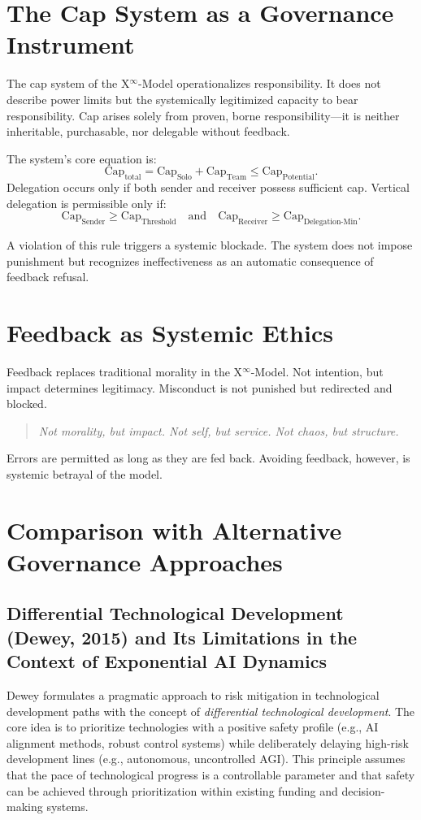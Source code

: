 \documentclass[11pt]{article}
\begin{document}
\section{The Cap System as a Governance Instrument}
The cap system of the X$^\infty$-Model operationalizes responsibility. It does not describe power limits but the systemically legitimized capacity to bear responsibility. Cap arises solely from proven, borne responsibility—it is neither inheritable, purchasable, nor delegable without feedback.

The system’s core equation is:
\begin{equation}
\text{Cap}_{\text{total}} = \text{Cap}_{\text{Solo}} + \text{Cap}_{\text{Team}} \leq \text{Cap}_{\text{Potential}}.
\end{equation}
Delegation occurs only if both sender and receiver possess sufficient cap. Vertical delegation is permissible only if:
\begin{equation}
\text{Cap}_{\text{Sender}} \geq \text{Cap}_{\text{Threshold}} \quad \text{and} \quad \text{Cap}_{\text{Receiver}} \geq \text{Cap}_{\text{Delegation-Min}}.
\end{equation}

A violation of this rule triggers a systemic blockade. The system does not impose punishment but recognizes ineffectiveness as an automatic consequence of feedback refusal.

\section{Feedback as Systemic Ethics}
Feedback replaces traditional morality in the X$^\infty$-Model. Not intention, but impact determines legitimacy. Misconduct is not punished but redirected and blocked.

\begin{quote}
\emph{Not morality, but impact. Not self, but service. Not chaos, but structure.}
\end{quote}

Errors are permitted as long as they are fed back. Avoiding feedback, however, is systemic betrayal of the model.

\section{Comparison with Alternative Governance Approaches}
\subsection{Differential Technological Development (Dewey, 2015) and Its Limitations in the Context of Exponential AI Dynamics}
Dewey \citep{Dewey2015} formulates a pragmatic approach to risk mitigation in technological development paths with the concept of \emph{differential technological development}. The core idea is to prioritize technologies with a positive safety profile (e.g., AI alignment methods, robust control systems) while deliberately delaying high-risk development lines (e.g., autonomous, uncontrolled AGI). This principle assumes that the pace of technological progress is a controllable parameter and that safety can be achieved through prioritization within existing funding and decision-making systems.
\end{document}
